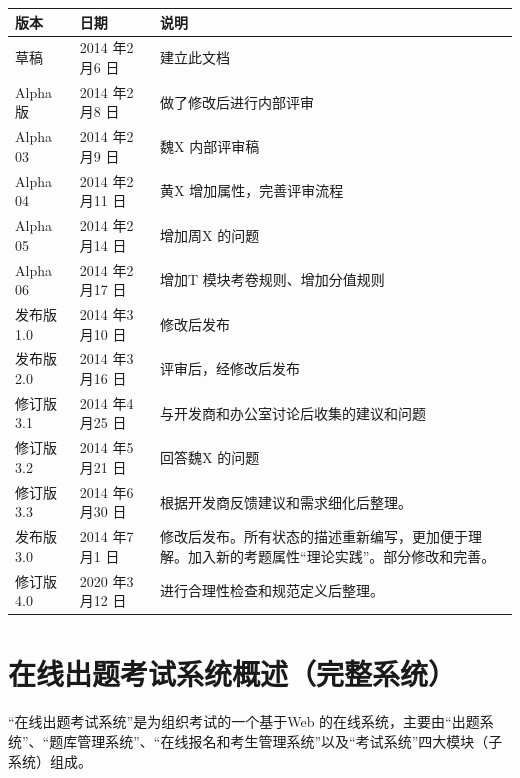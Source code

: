 \documentclass[hyperref, a4paper]{ctexart}
\begin{document}
\begin{center}
\begin{tabular}{|p{2cm}|p{3.3cm}|p{8cm}|}
\hline
版本 & 日期 & 说明\\
\hline
草稿 & 2014 年2 月6 日 & 建立此文档\\
\hline
Alpha 版 & 2014 年2 月8 日 & 做了修改后进行内部评审\\
\hline
Alpha 03 & 2014 年2 月9 日 & 魏X 内部评审稿\\
\hline
Alpha 04 & 2014 年2 月11 日 & 黄X 增加属性，完善评审流程\\
\hline
Alpha 05 & 2014 年2 月14 日 & 增加周X 的问题\\
\hline
Alpha 06 & 2014 年2 月17 日 & 增加T 模块考卷规则、增加分值规则\\
\hline
发布版 1.0 & 2014 年3 月10 日 & 修改后发布\\
\hline
发布版 2.0 & 2014 年3 月16 日 & 评审后，经修改后发布\\
\hline
修订版3.1 & 2014 年4 月25 日 & 与开发商和办公室讨论后收集的建议和问题\\
\hline
修订版3.2 & 2014 年5 月21 日 & 回答魏X 的问题\\
\hline
修订版3.3 & 2014 年6 月30 日 & 根据开发商反馈建议和需求细化后整理。\\
\hline
发布版3.0 & 2014 年7 月1 日 & 修改后发布。所有状态的描述重新编写，更加便于理解。加入新的考题属性“理论实践”。部分修改和完善。\\
\hline
修订版4.0 & 2020 年3 月12 日 & 进行合理性检查和规范定义后整理。\\
\hline
\end{tabular}
\end{center}

\normalsize

\newpage

\tableofcontents

\newpage

\hypertarget{ux5728ux7ebfux51faux9898ux8003ux8bd5ux7cfbux7edfux6982ux8ff0ux5b8cux6574ux7cfbux7edf}{%
\section*{在线出题考试系统概述（完整系统）}\label{ux5728ux7ebfux51faux9898ux8003ux8bd5ux7cfbux7edfux6982ux8ff0ux5b8cux6574ux7cfbux7edf}}

``在线出题考试系统''是为组织考试的一个基于Web
的在线系统，主要由``出题系统''、``题库管理系统''、``在线报名和考生管理系统''以及``考试系统''四大模块（子系统）组成。
\end{document}

